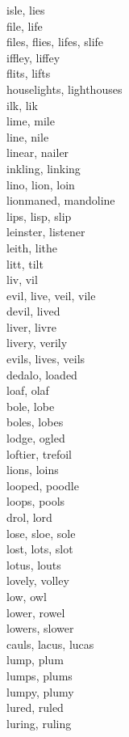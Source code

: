 isle, lies\\
file, life\\
files, flies, lifes, slife\\
iffley, liffey\\
flits, lifts\\
houselights, lighthouses\\
ilk, lik\\
lime, mile\\
line, nile\\
linear, nailer\\
inkling, linking\\
lino, lion, loin\\
lionmaned, mandoline\\
lips, lisp, slip\\
leinster, listener\\
leith, lithe\\
litt, tilt\\
liv, vil\\
evil, live, veil, vile\\
devil, lived\\
liver, livre\\
livery, verily\\
evils, lives, veils\\
dedalo, loaded\\
loaf, olaf\\
bole, lobe\\
boles, lobes\\
lodge, ogled\\
loftier, trefoil\\
lions, loins\\
looped, poodle\\
loops, pools\\
drol, lord\\
lose, sloe, sole\\
lost, lots, slot\\
lotus, louts\\
lovely, volley\\
low, owl\\
lower, rowel\\
lowers, slower\\
cauls, lacus, lucas\\
lump, plum\\
lumps, plums\\
lumpy, plumy\\
lured, ruled\\
luring, ruling\\

